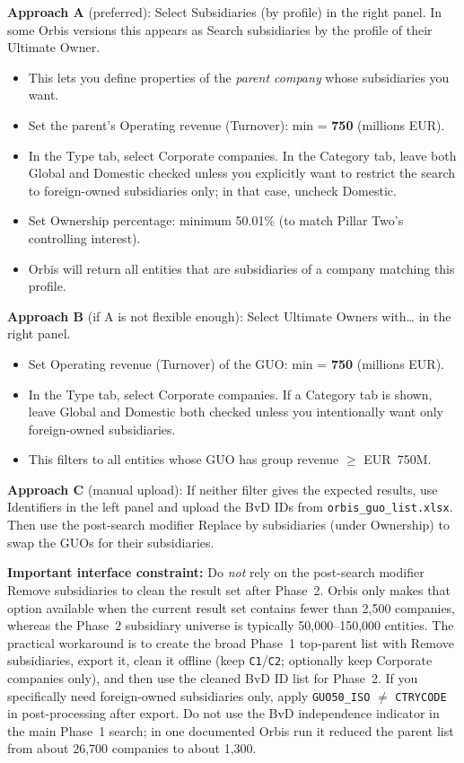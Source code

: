 \documentclass[11pt,a4paper]{article}
\newcommand{\field}[1]{\texttt{#1}}
\newcommand{\menu}[1]{\textsf{#1}}
\begin{document}
\textbf{Approach A} (preferred): Select \menu{Subsidiaries (by profile)} in the right panel. In some Orbis versions this appears as \menu{Search subsidiaries by the profile of their Ultimate Owner}.
\begin{itemize}[noitemsep]
  \item This lets you define properties of the \emph{parent company} whose subsidiaries you want.
  \item Set the parent's \menu{Operating revenue (Turnover)}: min = \textbf{750} (millions EUR).
  \item In the \menu{Type} tab, select \menu{Corporate companies}. In the \menu{Category} tab, leave both \menu{Global} and \menu{Domestic} checked unless you explicitly want to restrict the search to foreign-owned subsidiaries only; in that case, uncheck \menu{Domestic}.
  \item Set \menu{Ownership percentage}: minimum 50.01\% (to match Pillar Two's controlling interest).
  \item Orbis will return all entities that are subsidiaries of a company matching this profile.
\end{itemize}

\textbf{Approach B} (if A is not flexible enough): Select \menu{Ultimate Owners with\ldots} in the right panel.
\begin{itemize}[noitemsep]
  \item Set \menu{Operating revenue (Turnover)} of the GUO: min = \textbf{750} (millions EUR).
  \item In the \menu{Type} tab, select \menu{Corporate companies}. If a \menu{Category} tab is shown, leave \menu{Global} and \menu{Domestic} both checked unless you intentionally want only foreign-owned subsidiaries.
  \item This filters to all entities whose GUO has group revenue $\geq$ EUR~750M.
\end{itemize}

\textbf{Approach C} (manual upload): If neither filter gives the expected results, use \menu{Identifiers} in the left panel and upload the BvD IDs from \texttt{orbis\_guo\_list.xlsx}. Then use the post-search modifier \menu{Replace by subsidiaries} (under \menu{Ownership}) to swap the GUOs for their subsidiaries.

\textbf{Important interface constraint:} Do \emph{not} rely on the post-search modifier \menu{Remove subsidiaries} to clean the result set after Phase~2. Orbis only makes that option available when the current result set contains fewer than 2,500 companies, whereas the Phase~2 subsidiary universe is typically 50,000--150,000 entities. The practical workaround is to create the broad Phase~1 top-parent list with \menu{Remove subsidiaries}, export it, clean it offline (keep \field{C1}/\field{C2}; optionally keep \menu{Corporate companies} only), and then use the cleaned BvD ID list for Phase~2. If you specifically need foreign-owned subsidiaries only, apply \field{GUO50\_ISO} $\neq$ \field{CTRYCODE} in post-processing after export. Do not use the \menu{BvD independence indicator} in the main Phase~1 search; in one documented Orbis run it reduced the parent list from about 26,700 companies to about 1,300.
\end{document}
